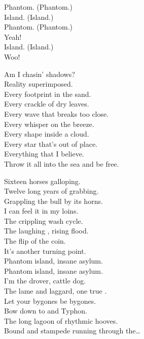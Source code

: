 
Phantom. (Phantom.) \\
Island. (Island.) \\
Phantom. (Phantom.) \\
Yeah! \\
Island. (Island.) \\
Woo! \\


Am I chasin' shadows? \\
Reality superimposed. \\
Every footprint in the sand. \\
Every crackle of dry leaves. \\
Every wave that breaks too close. \\
Every whisper on the breeze. \\
Every shape inside a cloud. \\
Every star that's out of place. \\
Everything that I believe. \\
Throw it all into the sea and be free. \\


Sixteen horses galloping. \\
Twelve long years of grabbing. \\
Grappling the bull by its horns. \\
I can feel it in my loins. \\
The crippling  wash cycle. \\
The laughing , rising flood. \\
The flip of the coin. \\
It's another turning point. \\

Phantom island, insane asylum. \\
Phantom island, insane asylum. \\
I'm the drover, cattle dog. \\
The lame and laggard, one true . \\

Let your bygones be bygones. \\
Bow down to  and Typhon. \\
The long lagoon of rhythmic hooves. \\
Bound and stampede running through the… \\

